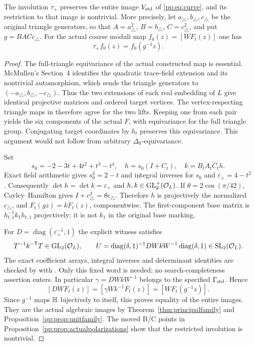 \begin{proposition}
\label{pp:prop:unitcurve}
The involution $\tau_+$ preserves the entire image $V_{\rm std}$ of
\eqref{pp:eq:curve}, and its restriction to that image is nontrivial.
More precisely, let $a_\triangle,b_\triangle,c_\triangle$ be the
original triangle generators, so that
$A=a_\triangle^2$, $B=b_\triangle$, $C=c_\triangle^2$, and put
$g=BACc_\triangle$. For the actual coarse moduli map
$f_0(z)=[WF_t(z)]$ one has
\[
 \tau_+f_0(z)=f_0(g^{-1}z).
\]
\end{proposition}
\begin{proof}
The full-triangle equivariance of the actual constructed map is essential.
McMullen's Section~4 identifies the quadratic trace-field extension and
its nontrivial automorphism, which sends the triangle generators to
$(-a_\triangle,b_\triangle,-c_\triangle)$.
Thus the two extensions of each real embedding of $L$ give identical
projective matrices and ordered target vertices. The vertex-respecting
triangle maps in \cite[Thm.~6.3, Eq.~(6.1)]{McMullen2026} therefore agree
for the two lifts. Keeping one from each pair yields the six components
of the actual $F$, with equivariance for the full triangle group.
Conjugating target coordinates by $h_t$ preserves this equivariance.
This argument would not follow from arbitrary $\Delta_0$-equivariance.

Set
\[
 s_0=-2-3t+4t^2+t^3-t^4,\quad
 h=s_0(I+C_t),\quad k=B_tA_tC_th.
\]
Exact field arithmetic gives $s_0^2=2-t$ and integral inverses for
$s_0$ and $\varepsilon_+=4-t^2$. Consequently
$\det h=\det k=\varepsilon_+$ and $h,k\in\operatorname{GL}_2^+(\mathcal O_L)$.
If $\theta=2\cos(\pi/42)$, Cayley--Hamilton gives
$I+c_\triangle^2=\theta c_\triangle$.
Therefore $h$ is projectively the normalized $c_\triangle$, and
$F_t(gz)=kF_t(z)$, componentwise. The first-component base matrix
is $h_{t,1}^{-1}k_1h_{t,1}$ projectively; it is not $k_1$ in the
original base marking.

For $D=\operatorname{diag}(\varepsilon_+^{-1},1)$ the explicit witness
satisfies
\[
 T^{-1}k^{-\mathsf T}T\in\operatorname{GL}_2(\mathcal O_L),\qquad
 U=\operatorname{diag}(\delta,1)^{-1}
       DWkW^{-1}\operatorname{diag}(\delta,1)\in\operatorname{SL}_2(\mathcal O_L).
\]
The exact coefficient arrays, integral inverses and determinant identities
are checked by  with
.
Only this fixed word is needed; no search-completeness assertion enters.
In particular $\gamma=DWkW^{-1}$ belongs to the specified
$\Gamma_{\rm std}$. Hence
\[
 [DWF_t(z)]=[\gamma Wk^{-1}F_t(z)]
          =[WF_t(g^{-1}z)].
\]
Since $g^{-1}$ maps $\mathbb H$ bijectively to itself, this proves equality
of the entire images. They are the actual algebraic images by
Theorem~\ref{thm:principalfamily} and
Proposition~\ref{pp:prop:unitfamily}.
The moved B/C points in Proposition~\ref{pp:prop:actualpolarizations}
show that the restricted involution is nontrivial.
\end{proof}

